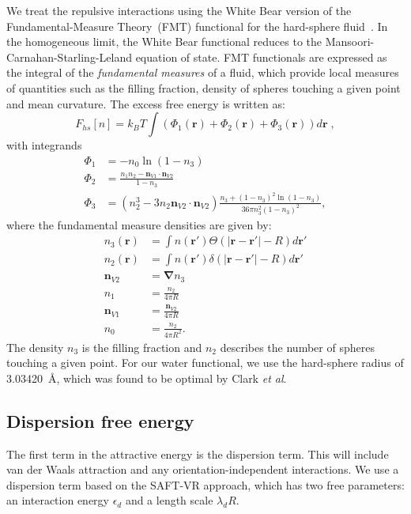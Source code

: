 \documentclass[letterpaper,twocolumn,amsmath,amssymb,prb]{revtex4-1}
\newcommand{\xx}{\textbf{r}}
\begin{document}
We treat the repulsive interactions using the White Bear version of
the Fundamental-Measure Theory~(FMT) functional for the hard-sphere
fluid~\cite{roth2002whitebear}.  In the homogeneous limit, the White
Bear functional reduces to the Mansoori-Carnahan-Starling-Leland
equation of state.  FMT functionals are expressed as the integral of
the \emph{fundamental measures} of a fluid, which provide local
measures of quantities such as the filling fraction, density of
spheres touching a given point and mean curvature.  The excess free
energy is written as:
\begin{equation}
F_{hs}[n] = k_B T \int (\Phi_1(\xx) + \Phi_2(\xx) + \Phi_3(\xx)) d\xx \; ,
\end{equation}
with integrands
\begin{align}
\Phi_1 &= -n_0 \ln\left( 1 - n_3\right)\\
\Phi_2 &= \frac{n_1 n_2 - \mathbf{n}_{V1} \cdot\mathbf{n}_{V2}}{1-n_3} \\
\Phi_3 &= (n_2^3 - 3n_2 \mathbf{n}_{V2} \cdot \mathbf{n}_{V2})
  \frac{
    n_3 + (1-n_3)^2\ln(1-n_3)
  }{
    36\pi n_3^2\left( 1 - n_3 \right)^2
  } ,
\end{align}
where the fundamental measure densities are given by:
\begin{align}
  n_3(\xx) &= \int n(\xx') \Theta(\left|\xx - \xx'\right| - R) d\xx' \\
  n_2(\xx) &= \int n(\xx') \delta(\left|\xx - \xx'\right| - R) d\xx'
  \\
  \mathbf{n}_{V2} &= \mathbf{\nabla} n_3 \\
  n_1 &= \frac{n_2}{4\pi R}\\
  \mathbf{n}_{V1} &= \frac{\mathbf{n}_{V2}}{4\pi R}\\
  n_0 &= \frac{n_2}{4\pi R^2}.
\end{align}
The density $n_3$ is the filling fraction and $n_2$ describes the number
of spheres touching a given point. For our water functional, we use the 
hard-sphere radius of
3.03420~\AA, which was found to be optimal by Clark
\emph{et al}.\cite{clark2006developing}

\newcommand\etadisp{\ensuremath{\eta_\textit{d}}}
\newcommand\epsilondisp{\ensuremath{\epsilon_\textit{d}}}
\newcommand\epsilonassoc{\ensuremath{\epsilon_\textit{a}}}
\newcommand\kappaassoc{\ensuremath{\kappa_\textit{a}}}
\newcommand\lambdadisp{\ensuremath{\lambda_\textit{d}}}
\newcommand\lscale{\ensuremath{s_d}}
\subsection{Dispersion free energy}
The first term in the attractive energy is the dispersion term.  This
will include van der Waals attraction and any orientation-independent
interactions. We use a dispersion term based on the SAFT-VR
approach\cite{gil-villegas-1997-SAFT-VR}, which has two free
parameters: an interaction energy $\epsilondisp$ and a
length scale $\lambdadisp R$.
\end{document}
